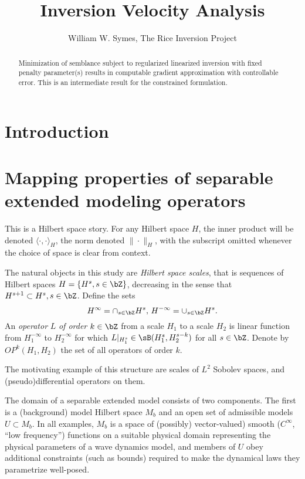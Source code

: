 \title{Inversion Velocity Analysis}
\date{}
\author{William W. Symes, The Rice Inversion Project}

\maketitle
\parskip 12pt
\begin{abstract}
Minimization of semblance subject to regularized linearized inversion with fixed penalty parameter(s) results in computable gradient approximation with controllable error. This is an intermediate result for the constrained formulation.
\end{abstract}

\section{Introduction}

\section{Mapping properties of separable extended modeling operators}
This is a Hilbert space story. For any Hilbert space $H$, the inner
product will be denoted $\langle \cdot, \cdot \rangle_H$, the norm
denoted $\| \cdot \|_H$, with the subscript omitted whenever the
choice of space is clear from context. 

The natural objects in this study are {\em Hilbert space scales}, that
is sequences of Hilbert spaces $H = \{ H^s, s \in \bZ\}$, decreasing in
the sense that
$H^{s+1} \subset H^s, s \in \bZ$. Define the sets
\[
H^{\infty} = \cap_{s \in \bZ} H^s, \,H^{-\infty} = \cup_{s \in
  \bZ}H^s.
\]
An {\em operator} $L$  {\em of order $k \in \bZ$} from
a scale $H_1$ to a scale $H_2$ is linear function from $H_1^{-\infty}$ to
$H_2^{-\infty}$ for which $L|_{H_1^s} \in \sB(H_1^s,H_2^{s-k})$ for
all $ s \in
\bZ$. Denote by $OP^k(H_1,H_2)$ the set of all operators of order $k$.

The motivating example of this structure are scales of $L^2$ Sobolev
spaces, and (pseudo)differential operators on them.

The domain of a separable extended model consists of two
components. The first is a (background) model Hilbert space $M_b$ and
an open set of admissible models
$U \subset M_b$. In all examples, $M_b$ is a space of (possibly)
vector-valued) smooth ($C^{\infty}$, ``low frequency'') functions on a suitable physical
domain representing the physical parameters of a wave dynamics model, and members of $U$ obey additional constraints (such as
bounds) required to make the dynamical laws they parametrize
well-posed. 

